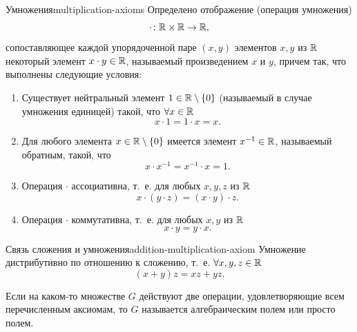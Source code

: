 \begin{axiom}{Умножения}{multiplication-axioms}
  Определено отображение (операция умножения)
  \[
    \cdot\colon \mathbb{R}\times\mathbb{R}\to\mathbb{R},
  \]
  сопоставляющее каждой упорядоченной паре $(x,y)$ элементов $x,y$ из $\mathbb{R}$
  некоторый элемент $x\cdot y\in\mathbb{R}$, называемый произведением $x$ и $y$,
  причем так, что выполнены следующие условия:
  \begin{enumerate}[label=\arabic*${}^{\cdot}$.]
    \item Существует нейтральный элемент $1\in\mathbb{R}\setminus\{0\}$
      (называемый в случае умножения единицей) такой, что $\forall x\in\mathbb{R}$
      \[
        x\cdot1=1\cdot x=x.
      \]\par
    \item Для любого элемента $x\in\mathbb{R}\setminus\{0\}$ имеется элемент
      $x^{-1}\in\mathbb{R}$, называемый обратным, такой, что
      \[
        x\cdot x^{-1}=x^{-1}\cdot x=1.
      \]\par
    \item Операция $\cdot$ ассоциативна, т.~е. для любых $x,y,z$ из $\mathbb{R}$
      \[
        x\cdot(y\cdot z)=(x\cdot y)\cdot z.
      \]\par
    \item Операция $\cdot$ коммутативна, т.~е. для любых $x,y$ из $\mathbb{R}$
      \[
        x\cdot y=y\cdot x.
      \]
  \end{enumerate}
\end{axiom}

\begin{axiom}{Связь сложения и умножения}{addition-multiplication-axiom}
  Умножение дистрибутивно по отношению к сложению, т.~е.
  $\forall x,y,z\in\mathbb{R}$
  \[
    (x+y)z=xz+yz.
  \]
\end{axiom}

Если на каком-то множестве $G$ действуют две операции, удовлетворяющие
всем перечисленным аксиомам, то $G$ называется алгебраическим полем или
просто полем.

